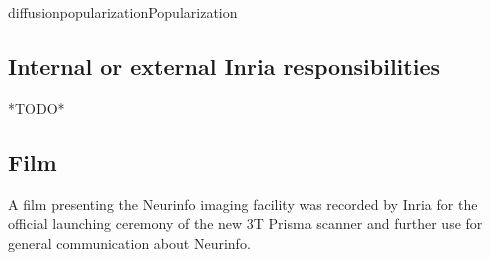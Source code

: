 \documentclass{ra2018}
\begin{document}
\begin{module}{diffusion}{popularization}{Popularization}



\subsection{Internal or external Inria responsibilities}
*TODO*

\subsection{Film}

A film presenting the Neurinfo imaging facility was recorded by Inria for the official launching ceremony of the new 3T Prisma scanner and further use for general communication about Neurinfo. 


\end{module}
\end{document}

